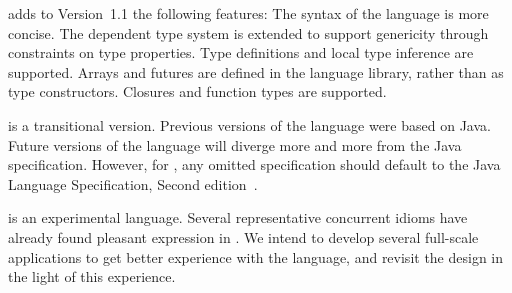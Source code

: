 {}\XtenCurrVer{} adds to Version~1.1 the following features:
The syntax of the language is more concise.
The dependent type system is extended to support genericity through
constraints on type properties.  Type definitions and local type inference are
supported.  Arrays and futures are defined in the language library, rather than
as type constructors.  Closures and function types are supported.

\XtenCurrVer{} is a transitional version.  Previous versions
of the language were based on Java.  Future versions of the language will 
diverge more and more from the Java specification.
However, for \XtenCurrVer{}, any omitted specification should default
to
the Java Language Specification, Second edition~\cite{jls2}.

{}\Xten{} is an experimental language.  Several representative
concurrent idioms have already found pleasant expression in \Xten. We
intend to develop several full-scale applications to get better
experience with the language, and revisit the design in the light of
this experience.


